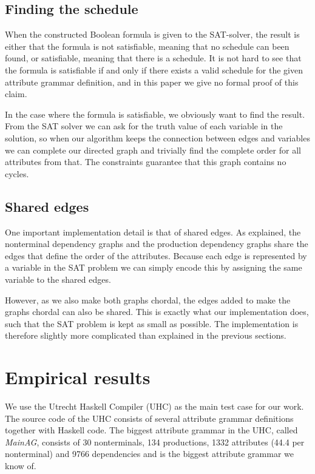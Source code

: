 \documentclass{llncs}
\begin{document}
\subsection{Finding the schedule}
When the constructed Boolean formula is given to the SAT-solver, the result is either that the formula is not satisfiable, meaning that no schedule can been found, or satisfiable, meaning that there is a schedule. It is not hard to see that the formula is satisfiable if and only if there exists a valid schedule for the given attribute grammar definition, and in this paper we give no formal proof of this claim.

In the case where the formula is satisfiable, we obviously want to find the result. From the SAT solver we can ask for the truth value of each variable in the solution, so when our algorithm keeps the connection between edges and variables we can complete our directed graph and trivially find the complete order for all attributes from that. The constraints guarantee that this graph contains no cycles.

\subsection{Shared edges}
One important implementation detail is that of shared edges. As explained, the nonterminal dependency graphs and the production dependency graphs share the edges that define the order of the attributes. Because each edge is represented by a variable in the SAT problem we can simply encode this by assigning the same variable to the shared edges.

However, as we also make both graphs chordal, the edges added to make the graphs chordal can also be shared. This is exactly what our implementation does, such that the SAT problem is kept as small as possible. The implementation is therefore slightly more complicated than explained in the previous sections.

\section{Empirical results} \label{sect:results}
We use the Utrecht Haskell Compiler (UHC) \cite{Dijkstra:2009} as the main test case for our work. The source code of the UHC consists of several attribute grammar definitions together with Haskell code. The biggest attribute grammar in the UHC, called \emph{MainAG}, consists of 30 nonterminals, 134 productions, 1332 attributes (44.4 per nonterminal) and 9766 dependencies and is the biggest attribute grammar we know of.
\end{document}
